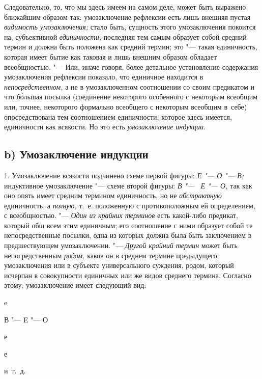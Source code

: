 Следовательно, то, что мы здесь имеем на самом деле, может
быть выражено ближайшим образом так: умозаключение рефлексии есть лишь
внешняя пустая {\em видимость
умозаключения;} стало быть, сущность этого умозаключения
покоится на, субъективной {\em единичности;}
последняя тем самым образует собой средний термин и должна
быть положена как средний термин; это "--- такая единичность,
которая имеет бытие как таковая и лишь внешним образом обладает
всеобщностью. "--- Или, иначе говоря, более детальное
установление содержания умозаключения рефлексии показало, что единичное
находится в {\em непосредственном,}
а не в умозаключенном соотношении со своим предикатом и что
б\'{о}льшая посылка (соединение некоторого особенного с некоторым всеобщим или,
точнее, некоторого формально всеобщего с некоторым всеобщим в~себе)
опосредствована тем соотношением единичности, которое здесь имеется,
единичности как всякости. Но это есть {\em умозаключение индукции}.

\subsection[b) Умозаключение индукции]{b) Умозаключение индукции}

1. Умозаключение всякости подчинено схеме первой фигуры:
{\em Е "--- О "--- В;} индуктивное умозаключение "--- схеме второй
фигуры: {\em В "--- ~Е "--- О,} так как оно опять имеет средним термином
единичность, но не {\em абстрактную} единичность, а {\em полную,} т.~е.
положенную с противоположным ей определением,
с всеобщностью. "--- {\em Один из крайних терминов} есть какой-либо предикат,
который общ всем этим единичным; его соотношение с ними образует собой
те непосредственные посылки, одна из которых должна была быть заключением
в предшествующем умозаключении. "--- {\em Другой крайний термин}
может быть непосредственным {\em родом,} каков он в среднем термине
предыдущего умозаключения или в субъекте универсального
суждения, родом, который исчерпан в совокупности единичных или же видов
среднего термина. Согласно этому, умозаключение имеет следующий вид:

{\centering
e
\par}

{\centering
В "--- E "--- О
\par}

{\centering
е
\par}

{\centering
е
\par}

{\centering
и~т.~д.
\par}

